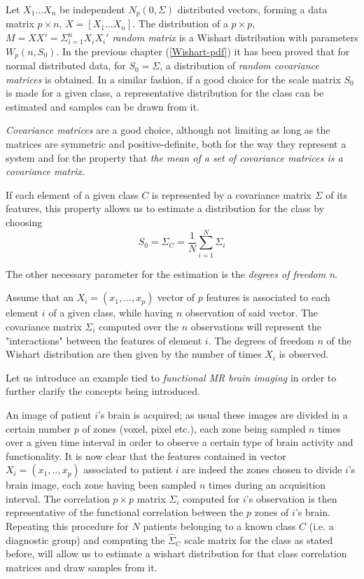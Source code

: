 \documentclass[12pt,openright,twoside,a4paper]{book}
\begin{document}
Let $X_1...X_n$ be independent $N_p(0,\Sigma)$ distributed vectors, forming a data matrix $p\times n$, $X=[X_1...X_n]$.
The distribution of  a $p\times p$, $M=XX'=\Sigma^n_{i=1}X_iX_i'$ \textit{random matrix}  is a Wishart distribution with parameters $W_p (n, S_0 )$. In the previous chapter (\ref{Wishart-pdf}) it has been proved that for normal distributed data, for $S_0=\Sigma$, a distribution of \textit{random covariance matrices} is obtained.
In a similar fashion, if a good choice for the scale matrix $S_0$ is made for a given class, a representative distribution for the class can be estimated and samples can be drawn from it.

\textit{Covariance matrices} are a good choice, although not limiting as long as the matrices are symmetric and positive-definite, both for the way they represent a system and for the property that \textit{the mean of a set of covariance matrices is a covariance matrix}. 

If each element of a given class $C$ is represented by a covariance matrix $\Sigma$ of its features, this property allows us to estimate a distribution for the class by choosing 
\begin{equation}
S_0=\hat{\Sigma}_C=\frac{1}{N}\sum_{i=1}^N \Sigma_i
\label{Class-Scale}
\end{equation}


The other necessary parameter for the estimation is the \textit{degrees of freedom n}.

Assume that an $X_i=(x_1, ..., x_p)$ vector of $p$ features is associated to each element $i$ of a given class, while having $n$ observation of said vector. The covariance matrix $\Sigma_i$ computed over the $n$ observations will represent the "interactions" between the features of element $i$.
The degrees of freedom  $n$ of the Wishart distribution are then given by the number of times $X_i$ is observed.

Let us introduce an example tied to \textit{functional MR brain imaging } in order to further clarify the concepts being introduced. 

An image of patient $i$'s brain is acquired; as usual these images are divided in a certain number $p$ of zones (voxel, pixel etc.), each zone being sampled $n$ times over a given time interval in order to observe a certain type of brain activity and functionality.
It is now clear that the features contained in vector $X_i=(x_1,..,x_p)$ associated to patient $i$ are indeed the zones chosen to divide $i$'s brain image, each zone having been sampled $n$ times during an acquisition interval.
The correlation $p \times p$ matrix $\Sigma_i$ computed for $i$'s observation is then representative of the functional correlation between the $p$ zones of $i$'s brain.
Repeating this procedure for $N$ patients belonging to a known class $C$ (i.e. a diagnostic group) and computing the $\hat{\Sigma}_C$ scale matrix for the class as stated before, will allow us to estimate a wishart distribution for that class correlation matrices and draw samples from it.
\end{document}
